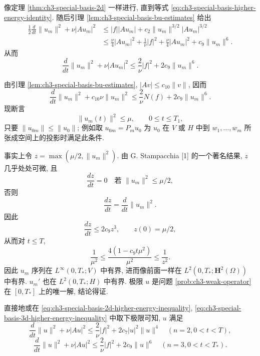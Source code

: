 \begin{Proof}
像定理 \ref{thm:ch3-special-basis-2d} 一样进行, 直到等式 \eqref{eq:ch3-special-basis-higher-energy-identity}. 随后引理 \ref{lem:ch3-special-basis-bu-estimates} 给出
\[
\begin{aligned}
\frac12\frac d{dt}\lVert u_m\rVert^2+\nu|Au_m|^2
&\leq|f||Au_m|+c_2\lVert u_m\rVert^{3/2}|Au_m|^{3/2}\\
&\leq\frac\nu4|Au_m|^2+\frac1\nu|f|^2
+\frac\nu4|Au_m|^2+c_9\lVert u_m\rVert^6.
\end{aligned}
\]
从而
\begin{equation}
\frac d{dt}\lVert u_m\rVert^2+\nu|Au_m|^2
\leq\frac2\nu|f|^2+2c_9\lVert u_m\rVert^6.
\label{eq:ch3-special-basis-3d-higher-energy-inequality}
\end{equation}

\hypertarget{chapter-03-page-230}{}
由引理 \ref{lem:ch3-special-basis-bu-estimates}, $|Av|\leq c_{10}\lVert v\rVert$, 因而
\begin{equation}
\frac d{dt}\lVert u_m\rVert^2+c_{10}\nu\lVert u_m\rVert^2
\leq\frac2\nu N(f)+2c_9\lVert u_m\rVert^6.
\label{eq:ch3-special-basis-3d-v-ode}
\end{equation}
现断言
\begin{equation}
\lVert u_m(t)\rVert^2\leq\mu,
\qquad0\leq t\leq T_1,
\label{eq:ch3-special-basis-3d-local-bound}
\end{equation}
只要 $\lVert u_{0m}\rVert\leq\lVert u_0\rVert$; 例如取 $u_{0m}=P_mu_0$ 为 $u_0$ 在 $V$ 或 $H$ 中到 $w_1,\ldots,w_m$ 所张成空间上的投影时满足此条件.

事实上令 $z=\max(\mu/2,\lVert u_m\rVert^2)$. 由 G. Stampacchia [1] 的一个著名结果, $z$ 几乎处处可微, 且
\[
\frac{dz}{dt}=0\quad\text{若 }\lVert u_m\rVert^2\leq\mu/2,
\]
否则
\[
\frac{dz}{dt}=\frac d{dt}\lVert u_m\rVert^2.
\]
因此
\[
\frac{dz}{dt}\leq2c_9z^3,
\qquad z(0)=\mu/2,
\]
从而对 $t\leq T$,
\[
\frac1{\mu^2}\leq\frac{4(1-c_9t\mu^2)}{\mu^2}\leq\frac1{z^2}.
\]
因此 $u_m$ 序列在 $L^\infty(0,T_*;V)$ 中有界, 进而像前面一样在 $L^2(0,T_*;\mathbf H^2(\Omega))$ 中有界. $u_m'$ 也在 $L^2(0,T_*;H)$ 中有界. 极限 $u$ 是问题 \ref{prob:ch3-weak-operator} 在 $[0,T_*]$ 上的唯一解, 结论得证.
\end{Proof}

\begin{Remark}
\label{rem:ch3-special-basis-limit-inequalities}
直接地或在 \eqref{eq:ch3-special-basis-2d-higher-energy-inequality}, \eqref{eq:ch3-special-basis-3d-higher-energy-inequality} 中取下极限可知, $u$ 满足
\begin{equation}
\frac d{dt}\lVert u\rVert^2+\nu|Au|^2
\leq\frac2\nu|f|^2+2c_7|u|^2\lVert u\rVert^4
\quad(n=2, 0<t<T),
\label{eq:ch3-special-basis-limit-2d}
\end{equation}
\begin{equation}
\frac d{dt}\lVert u\rVert^2+\nu|Au|^2
\leq\frac2\nu|f|^2+2c_9\lVert u\rVert^6
\quad(n=3, 0<t<T_*).
\label{eq:ch3-special-basis-limit-3d}
\end{equation}
\end{Remark}

